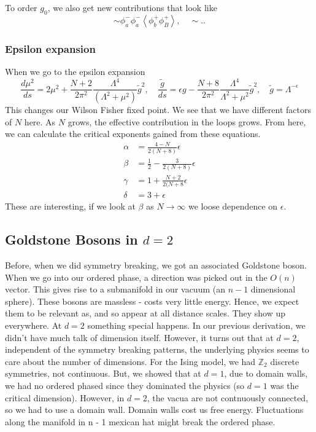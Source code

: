 To order $ g _ 0 $, we also get new contributions that look like 
\[
\sim \phi _ a ^ - \phi _ a ^ - \left< \phi_ b ^ + \phi _ B ^ +   \right>, \quad 
\sim ..
\] 
\subsubsection{Epsilon expansion} 

When we go to the epsilon expansion 
\[
\frac{ d \mu ^ 2 }{ ds } = 2 \mu ^ 2 + \frac{N + 2 }{ 2 \pi ^ 2 } \frac{ \Lambda ^ 4 }{ 
( \Lambda ^ 2 + \mu ^ 2 ) } \tilde{ g } ^ 2, \quad 
\frac{ \tilde{ g }  }{ ds }  = \epsilon g  - \frac{ N +  8 }{  2 \pi ^ 2 }  \frac{ \Lambda ^ 4 }{ 
\Lambda ^ 2+ \mu ^ 2 } \tilde{ g } ^ 2, \quad \tilde{ g }  = \Lambda ^{ - \epsilon }  
\] This changes our Wilson Fisher fixed point. We see that 
we have different factors of $ N $ here. 
As $ N  $ grows, the effective contribution in the loops grows. 
From here, we can calculate the critical exponents gained from 
these equations. 
\begin{align*}
\alpha &=  \frac{4 - N }{ 2 ( N + 8 ) } \epsilon  \\
\beta &=  \frac{1}{2 } - \frac{ 3 }{ 2 ( N + 8 ) } \epsilon  \\
\gamma &=  1 + \frac{ N + 2 }{ 2 ( N + 8  } \epsilon \\
\delta &=  3  + \epsilon  
\end{align*}
These are interesting, if we look at $ \beta $ as 
$ N \to \infty $ we loose dependence on $\epsilon$. 

\subsection{Goldstone Bosons in $ d = 2 $} 
Before, when we did symmetry breaking, we got an associated Goldstone boson. 
When we go into our ordered phase, a direction was picked out in the $ O ( n )  $ vector. 
This gives rise to a submanifold in our vacuum (an $ n -1 $ dimensional sphere). 
These bosons are massless - costs very little energy. 
Hence, we expect them to be relevant as, and so appear at all distance scales. 
They show up everywhere. 
At $ d =2 $ something special happens. 
In our previous derivation, we didn't have much talk of dimension itself. 
However, it turns out that at $ d = 2$, independent of the symmetry breaking patterns, 
the underlying physics seems to care about the number of dimensions. 
For the Ising model, we had $ \mathbb{ Z} _ 2 $ discrete symmetries, not continuous. 
But, we showed that at $ d = 1 $, due to domain walls, we had no ordered phased 
since they dominated the physics (so $ d = 1 $ was the critical dimension). 
However, in $ d = 2 $, the vacua are not contnuously connected, so 
we had to use a domain wall. Domain walls cost us free energy. Fluctuations 
along the manifold in n - 1 mexican hat might break the ordered phase. 

